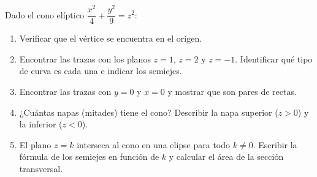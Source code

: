 Dado el cono elíptico $\dfrac{x^2}{4} + \dfrac{y^2}{9} = z^2$:
\begin{enumerate}
    \item Verificar que el vértice se encuentra en el origen.
    \item Encontrar las trazas con los planos $z = 1$, $z = 2$ y $z = -1$. Identificar qué tipo de curva es cada una e indicar los semiejes.
    \item Encontrar las trazas con $y = 0$ y $x = 0$ y mostrar que son pares de rectas.
    \item ¿Cuántas napas (mitades) tiene el cono? Describir la napa superior ($z > 0$) y la inferior ($z < 0$).
    \item El plano $z = k$ interseca al cono en una elipse para todo $k \neq 0$. Escribir la fórmula de los semiejes en función de $k$ y calcular el área de la sección transversal.
\end{enumerate}